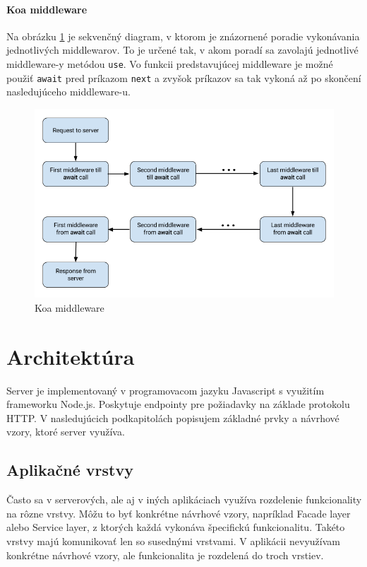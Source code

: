 \documentclass[
  digital, %
  table,   %
  lof,     %
  lot,     %
]{fithesis3}
\begin{document}
\paragraph{Koa middleware}
Na obrázku \ref{fig:koa-middleware} je sekvenčný diagram, v ktorom je znázornené poradie vykonávania jednotlivých middlewarov. To je určené tak, v akom poradí sa zavolajú jednotlivé middleware-y metódou \texttt{use}. Vo funkcii predstavujúcej middleware je možné použiť \texttt{await} pred príkazom 
\texttt{next} a zvyšok príkazov sa tak vykoná až po skončení nasledujúceho middleware-u.


\begin{figure}
	\begin{center}
	\includegraphics[width=\textwidth]{img/koa-middleware.png}
	\end{center}
    \caption{Koa middleware}
	\label{fig:koa-middleware}
\end{figure}


\section{Architektúra}
Server je implementovaný v programovacom jazyku Javascript s využitím frameworku Node.js. Poskytuje endpointy pre požiadavky na základe protokolu HTTP. V nasledujúcich podkapitolách popisujem základné prvky a návrhové vzory, ktoré server využíva.

\subsection{Aplikačné vrstvy}
Často sa v serverových, ale aj v iných aplikáciach využíva rozdelenie funkcionality na rôzne vrstvy. Môžu to byť konkrétne návrhové vzory, napríklad Facade layer alebo Service layer, z ktorých každá vykonáva špecifickú funkcionalitu. Takéto vrstvy majú komunikovať len so susednými vrstvami. V aplikácii nevyužívam konkrétne návrhové vzory, ale funkcionalita je rozdelená do troch vrstiev.
\end{document}
